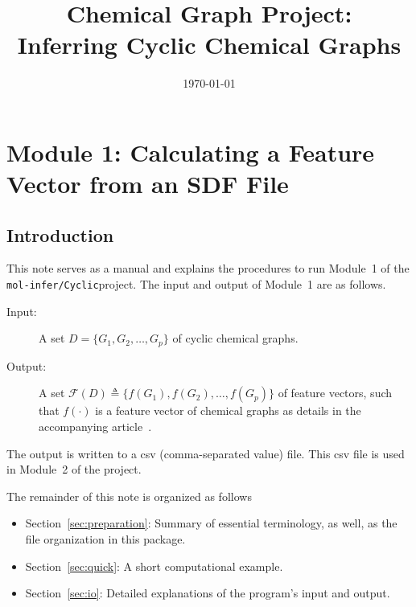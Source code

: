 \documentclass[11pt,titlepage,dvipdfmx,twoside]{book}
\title{\huge{
Chemical Graph Project: \\
Inferring Cyclic Chemical Graphs}}
\author{\project}
\newcommand{\project}{{\tt mol-infer/Cyclic}}
\newcommand{\secref}[1]{Section~\ref{sec:#1}}
\begin{document}
\date{\today}

\maketitle


\pagestyle{plain}
\tableofcontents
\clearpage


\chapter{Module 1:
Calculating a Feature Vector from an SDF File}


\section{Introduction}
This note serves as a manual and
explains the procedures to run Module~1 of the \project project.
The input and output of Module~1 are as follows.

\begin{oframed}
\begin{description}
\item[Input:] 
A set $D=\{G_1, G_2, \dots, G_p\}$ of cyclic chemical graphs. 
%
\item[Output:] 
A set ${\mathcal F}(D)\triangleq\{f(G_1), f(G_2), \dots, f(G_p)\}$
of feature vectors, such that $f(\cdot)$ is a feature vector of
chemical graphs as details in the accompanying article~\cite{AN20}.
%
\end{description}
\end{oframed}
%
The output is written to a csv (comma-separated value) file.
This csv file is used in Module~2 of the project.


The remainder of this note is organized as follows
\begin{itemize}
\item \secref{preparation}: 
Summary of essential terminology, as well, as the file organization
in this package.

\item \secref{quick}: 
A short computational example.

\item \secref{io}: 
Detailed explanations of the program's input and output.
\end{itemize}

\clearpage
\end{document}
